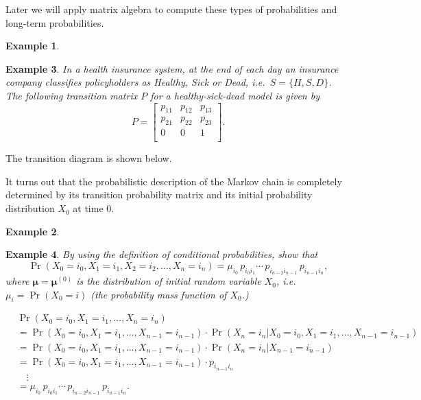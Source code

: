 \documentclass[
]{book}
\theoremstyle{definition}
\theoremstyle{definition}
\newtheorem{example}{Example}[chapter]
\theoremstyle{definition}
\theoremstyle{definition}
\theoremstyle{remark}
\begin{document}
Later we will apply matrix algebra to compute these types of
probabilities and long-term probabilities.

\begin{example}
\protect\hypertarget{exm:healthInsurance}{}\label{exm:healthInsurance}

\textbf{Example 3}. \emph{In a health insurance system, at the end of each day an
insurance company classifies policyholders as Healthy, Sick or Dead,
i.e.~\(S = \{H, S, D\}\). The following transition matrix \(P\) for a
healthy-sick-dead model is given by \[P = \begin{bmatrix}
    p_{11} & p_{12} & p_{13}    \\
    p_{21} & p_{22} & p_{23}   \\
   0 & 0 & 1   \\
\end{bmatrix}.\]}

\end{example}

The transition diagram is shown below.

It turns out that the probabilistic description of the Markov chain is
completely determined by its transition probability matrix and its
initial probability distribution \(X_0\) at time 0.

\begin{example}
\protect\hypertarget{exm:unlabeled-div-15}{}\label{exm:unlabeled-div-15}

\textbf{Example 4}. \emph{By using the definition of conditional probabilities,
show that
\[\Pr(X_0 = i_0, X_1 = i_1, X_2 = i_2, \ldots, X_n = i_n) = \mu_{i_0}\, p_{i_0i_1} \cdots \, p_{i_{n-2} i_{n-1}}\, p_{i_{n-1} i_n},\]
where \(\boldsymbol{\mu} = \boldsymbol{\mu}^{(0)}\) is the distribution of
initial random variable \(X_0\), i.e.~\(\mu_i = \Pr(X_0 = i)\) (the
probability mass function of \(X_0\).)}

\end{example}

\[\begin{aligned}
 &\Pr(X_0 = i_0, X_1 = i_1, \ldots, X_n = i_n) \\
  &= \Pr(X_0 = i_0, X_1 = i_1, \ldots, X_{n-1} = i_{n-1}) \cdot \Pr(X_n = i_n | X_0 = i_0, X_1 = i_1, \ldots, X_{n-1} = i_{n-1})\\
  &= \Pr(X_0 = i_0, X_1 = i_1, \ldots, X_{n-1} = i_{n-1}) \cdot \Pr(X_n = i_n |  X_{n-1} = i_{n-1})\\
  &=  \Pr(X_0 = i_0, X_1 = i_1, \ldots, X_{n-1} = i_{n-1}) \cdot p_{i_{n-1} i_n} \\
  &\quad \vdots \\
  &= \mu_{i_0}\, p_{i_0i_1} \cdots \, p_{i_{n-2} i_{n-1}}\, p_{i_{n-1} i_n}.
  \end{aligned}\]
\end{document}
